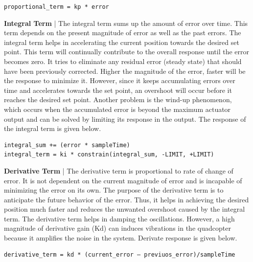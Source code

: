 \documentclass[a4paper,12pt,oneside]{book}
\begin{document}
\begin{center}
\begin{BVerbatim}
proportional_term = kp * error
\end{BVerbatim}
\end{center}

\bigskip

\textbf{Integral Term} | The integral term sums up the amount of error over time. This term depends on the present magnitude of error as well as the past errors. The integral term helps in accelerating the current position towards the desired set point. This term will continually contribute to the overall response until the error becomes zero. It tries to eliminate any residual error (steady state) that should have been previously corrected. Higher the magnitude of the error, faster will be the response to minimize it. However, since it keeps accumulating errors over time and accelerates towards the set point, an overshoot will occur before it reaches the desired set point. Another problem is the wind-up phenomenon, which occurs when the accumulated error is beyond the maximum actuator output and can be solved by limiting its response in the output. The response of the integral term is given below.

\begin{center}
\begin{BVerbatim}
integral_sum += (error * sampleTime)
integral_term = ki * constrain(integral_sum, -LIMIT, +LIMIT)
\end{BVerbatim}
\end{center}

\bigskip

\textbf{Derivative Term} | The derivative term is proportional to rate of change of error. It is not dependent on the current magnitude of error and is incapable of minimizing the error on its own. The purpose of the derivative term is to anticipate the future behavior of the error. Thus, it helps in achieving the desired position much faster and reduces the unwanted overshoot caused by the integral term. The derivative term helps in damping the oscillations. However, a high magnitude of derivative gain (Kd) can induces vibrations in the quadcopter because it amplifies the noise in the system. Derivate response is given below.

\begin{center}
\begin{BVerbatim}
derivative_term = kd * (current_error – previuos_error)/sampleTime
\end{BVerbatim}
\end{center}
\end{document}
